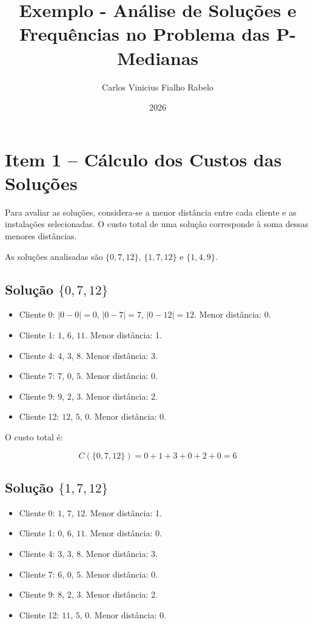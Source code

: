 \documentclass[12pt,a4paper]{article}
\title{Exemplo - Análise de Soluções e Frequências no Problema das P-Medianas}
\author{Carlos Vinicius Fialho Rabelo}
\date{2026}
\begin{document}
\maketitle

\section{Item 1 -- Cálculo dos Custos das Soluções}

Para avaliar as soluções, considera-se a menor distância
entre cada cliente e as instalações selecionadas.
O custo total de uma solução corresponde à soma dessas
menores distâncias.

As soluções analisadas são
$\{0,7,12\}$, $\{1,7,12\}$ e $\{1,4,9\}$.

\subsection{Solução $\{0,7,12\}$}

\begin{itemize}
    \item Cliente 0: $|0-0|=0$, $|0-7|=7$,
    $|0-12|=12$. Menor distância: 0.
    \item Cliente 1: $1$, $6$, $11$.
    Menor distância: 1.
    \item Cliente 4: $4$, $3$, $8$.
    Menor distância: 3.
    \item Cliente 7: $7$, $0$, $5$.
    Menor distância: 0.
    \item Cliente 9: $9$, $2$, $3$.
    Menor distância: 2.
    \item Cliente 12: $12$, $5$, $0$.
    Menor distância: 0.
\end{itemize}

O custo total é:

\[
C(\{0,7,12\}) = 0+1+3+0+2+0 = 6
\]

\subsection{Solução $\{1,7,12\}$}

\begin{itemize}
    \item Cliente 0: $1$, $7$, $12$.
    Menor distância: 1.
    \item Cliente 1: $0$, $6$, $11$.
    Menor distância: 0.
    \item Cliente 4: $3$, $3$, $8$.
    Menor distância: 3.
    \item Cliente 7: $6$, $0$, $5$.
    Menor distância: 0.
    \item Cliente 9: $8$, $2$, $3$.
    Menor distância: 2.
    \item Cliente 12: $11$, $5$, $0$.
    Menor distância: 0.
\end{itemize}
\end{document}
